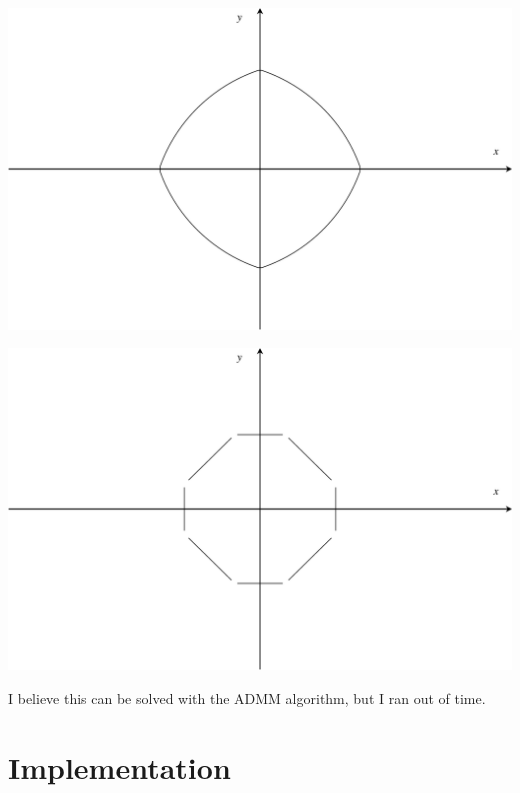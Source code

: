 \documentclass[12pt, a4paper, reqno]{article}
\numberwithin{equation}{section}
\begin{document}
\begin{center}
\begin{minipage}{.5\textwidth}
  \centering
  \includegraphics[width=.9\linewidth]{elasticnet.pdf}
\end{minipage}%
\begin{minipage}{.5\textwidth}
  \centering
  \includegraphics[width=.9\linewidth]{new_penalty_l1_and_linf.pdf}
\end{minipage}
\end{center}

I believe this can be solved with the ADMM algorithm, but I ran out of time.




\section{Implementation}
\end{document}
